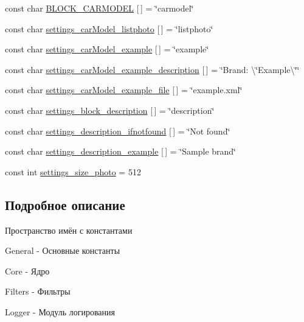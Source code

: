 \begin{DoxyCompactItemize}
\item 
const char \mbox{\hyperlink{namespaceyenot_a3c950090a29f01a39ec562e1e30452b9}{B\+L\+O\+C\+K\+\_\+\+C\+A\+R\+M\+O\+D\+EL}} \mbox{[}$\,$\mbox{]} = \char`\"{}carmodel\char`\"{}
\item 
const char \mbox{\hyperlink{namespaceyenot_a0a2414e62514c20e76cf0c522ebf38a3}{settings\+\_\+car\+Model\+\_\+listphoto}} \mbox{[}$\,$\mbox{]} = \char`\"{}listphoto\char`\"{}
\item 
const char \mbox{\hyperlink{namespaceyenot_af238d0e227de22ee3c26114077153efc}{settings\+\_\+car\+Model\+\_\+example}} \mbox{[}$\,$\mbox{]} = \char`\"{}example\char`\"{}
\item 
const char \mbox{\hyperlink{namespaceyenot_a5f4aa342b4a3e3f87069f6fef812594a}{settings\+\_\+car\+Model\+\_\+example\+\_\+description}} \mbox{[}$\,$\mbox{]} = \char`\"{}Brand\+: \textbackslash{}\char`\"{}Example\textbackslash{}\char`\"{}\char`\"{}
\item 
const char \mbox{\hyperlink{namespaceyenot_acd910e59eb17aa18802af8f4544aab48}{settings\+\_\+car\+Model\+\_\+example\+\_\+file}} \mbox{[}$\,$\mbox{]} = \char`\"{}example.\+xml\char`\"{}
\item 
const char \mbox{\hyperlink{namespaceyenot_aea7e9eb4d5b9e645f22e83e2d5fe893e}{settings\+\_\+block\+\_\+description}} \mbox{[}$\,$\mbox{]} = \char`\"{}description\char`\"{}
\item 
const char \mbox{\hyperlink{namespaceyenot_a53b4bd62fd7a6e3abedfdfb47db53284}{settings\+\_\+description\+\_\+ifnotfound}} \mbox{[}$\,$\mbox{]} = \char`\"{}Not found\char`\"{}
\item 
const char \mbox{\hyperlink{namespaceyenot_a37f90b0081fe0617055470d46489ea0f}{settings\+\_\+description\+\_\+example}} \mbox{[}$\,$\mbox{]} = \char`\"{}Sample brand\char`\"{}
\item 
const int \mbox{\hyperlink{namespaceyenot_a4e9a58fa114bcb3d3ae09fb62129f2c9}{settings\+\_\+size\+\_\+photo}} = 512
\end{DoxyCompactItemize}


\subsection{Подробное описание}
Пространство имён с константами 

General -\/ Основные константы

Core -\/ Ядро

Filters -\/ Фильтры

Logger -\/ Модуль логирования

